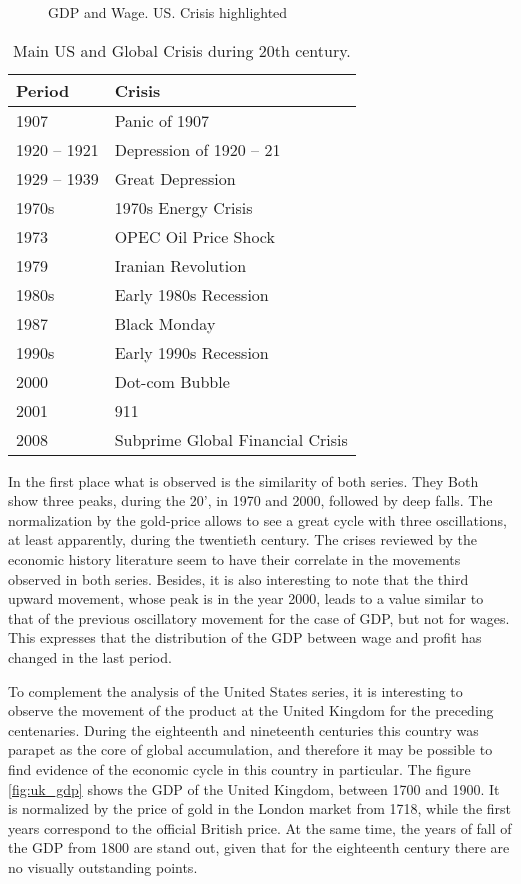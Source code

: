 \documentclass[a4paper]{article}
\begin{document}
\begin{figure}[H]
	\centering
	\caption{GDP and Wage. US. Crisis highlighted} \label{fig:series_crisis}
\end{figure}


\begin{table}[ht]
	\centering
	\begin{tabular}{ll}
		\hline
		Period & Crisis \\ 
		\hline
		1907 & Panic of 1907 \\ 
		1920 – 1921 & Depression of 1920 – 21 \\ 
		1929 – 1939 & Great Depression \\ 
		1970s & 1970s Energy Crisis \\ 
		1973 & OPEC Oil Price Shock \\ 
		1979 & Iranian Revolution\\ 
		1980s & Early 1980s Recession\\ 
		1987 & Black Monday \\ 
		1990s & Early 1990s Recession\\ 
		2000 & Dot-com Bubble \\ 
		2001 & 911 \\ 
		2008 & Subprime Global Financial Crisis \\ 
		\hline
	\end{tabular}
\caption{Main US and Global Crisis during 20th century.}
\label{tabla_crisis}
\end{table}

In the first place what is observed is the similarity of both series. They Both show three peaks, during the 20', in 1970 and 2000, followed by deep falls. The normalization by the gold-price allows to see a great cycle with three oscillations, at least apparently, during the twentieth century. The crises reviewed by the economic history literature seem to have their correlate in the movements observed in both series. Besides, it is also interesting to note that the third upward movement, whose peak is in the year 2000, leads to a value similar to that of the previous oscillatory movement for the case of GDP, but not for wages. This expresses that the distribution of the GDP between wage and profit has changed in the last period.

To complement the analysis of the United States series, it is interesting to observe the movement of the product at the United Kingdom for the preceding centenaries. During the eighteenth and nineteenth centuries this country was parapet as the core of global accumulation, and therefore it may be possible to find evidence of the economic cycle in this country in particular. The figure \ref{fig:uk_gdp} shows the GDP of the United Kingdom, between 1700 and 1900. It is normalized by the price of gold in the London market from 1718, while the first years correspond to the official British price. At the same time, the years of fall of the GDP from 1800 are stand out, given that for the eighteenth century there are no visually outstanding points.
\end{document}
